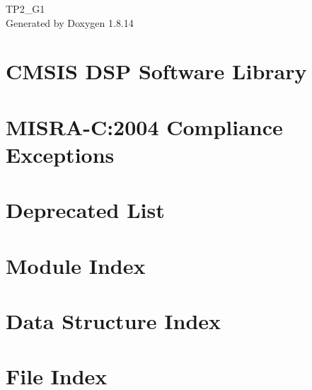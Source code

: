 \documentclass[twoside]{book}
\newcommand{\+}{\discretionary{\mbox{\scriptsize$\hookleftarrow$}}{}{}}
\newcommand{\clearemptydoublepage}{%
  \newpage{\pagestyle{empty}\cleardoublepage}%
}
\begin{document}
\hypersetup{pageanchor=false,
             bookmarksnumbered=true,
             pdfencoding=unicode
            }
\begin{titlepage}
\vspace*{7cm}
\begin{center}%
{\Large T\+P2\+\_\+\+G1 }\\
\vspace*{1cm}
{\large Generated by Doxygen 1.8.14}\\
\end{center}
\end{titlepage}
\clearemptydoublepage
{}
\tableofcontents
\clearemptydoublepage
{}
\hypersetup{pageanchor=true}

\chapter{C\+M\+S\+IS D\+SP Software Library}
\label{index}\hypertarget{index}{}
\chapter{M\+I\+S\+R\+A-\/C\+:2004 Compliance Exceptions}
\label{_c_m_s_i_s__m_i_s_r_a__exceptions}

\chapter{Deprecated List}
\label{deprecated}

\chapter{Module Index}

\chapter{Data Structure Index}

\chapter{File Index}

\end{document}
